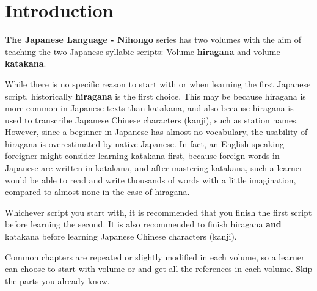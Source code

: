 \chapter*{Introduction}
\label{chap:Introduction}

\textbf{The Japanese Language - Nihongo} series has two volumes with the aim of
teaching the two Japanese syllabic scripts: Volume 
\textbf{hiragana} and volume  \textbf{katakana}.%
%
%

While there is no specific reason to start with \jtopic{} or \jtopicopposite{}
when learning the first Japanese script, historically \textbf{hiragana} is the
first choice. This may be because hiragana is more common in Japanese texts
than katakana, and also because hiragana is used to transcribe Japanese Chinese
characters (kanji), such as station names. However, since a beginner in
Japanese has almost no vocabulary, the usability of hiragana is overestimated
by native Japanese. In fact, an English-speaking foreigner might consider
learning katakana first, because foreign words in Japanese are written in
katakana, and after mastering katakana, such a learner would be able to read
and write thousands of words with a little imagination, compared to almost none
in the case of hiragana.  

Whichever script you start with, it is recommended that you finish the first
script before learning the second. It is also recommended to finish hiragana
\textbf{and} katakana before learning Japanese Chinese characters (kanji).

Common chapters are repeated or slightly modified in each volume, so a learner
can choose to start with volume {} or {} and get all
the references in each volume. Skip the parts you already know.




